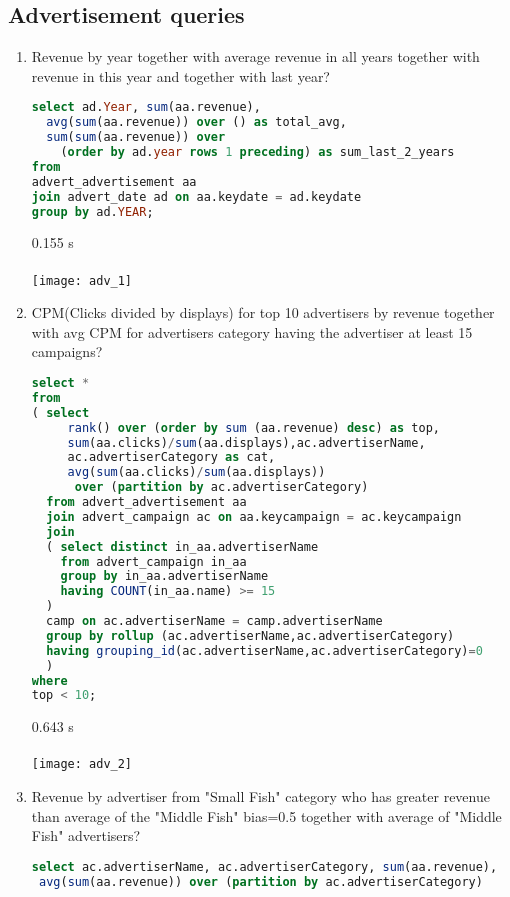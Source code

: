 \subsection*{Advertisement  queries} %
\label{sub:Advertisement queries}

\begin{enumerate}
\item Revenue by year together with average revenue in all years together with revenue in this year and together with last year?
\begin{lstlisting}[language=sql] 
select ad.Year, sum(aa.revenue), 
  avg(sum(aa.revenue)) over () as total_avg,
  sum(sum(aa.revenue)) over 
    (order by ad.year rows 1 preceding) as sum_last_2_years
from   
advert_advertisement aa
join advert_date ad on aa.keydate = ad.keydate
group by ad.YEAR;
\end{lstlisting}
     0.155 s\\ \\
      \texttt{[image: adv\_1]}
\item    CPM(Clicks divided by displays) for top 10 advertisers by revenue together with avg CPM for advertisers category having the advertiser at least 15 campaigns?
\begin{lstlisting}[language=sql] 
select *
from 
( select
     rank() over (order by sum (aa.revenue) desc) as top,
     sum(aa.clicks)/sum(aa.displays),ac.advertiserName,
     ac.advertiserCategory as cat, 
     avg(sum(aa.clicks)/sum(aa.displays)) 
      over (partition by ac.advertiserCategory)
  from advert_advertisement aa
  join advert_campaign ac on aa.keycampaign = ac.keycampaign
  join
  ( select distinct in_aa.advertiserName 
    from advert_campaign in_aa
    group by in_aa.advertiserName
    having COUNT(in_aa.name) >= 15
  )
  camp on ac.advertiserName = camp.advertiserName
  group by rollup (ac.advertiserName,ac.advertiserCategory) 
  having grouping_id(ac.advertiserName,ac.advertiserCategory)=0
  )
where 
top < 10;
\end{lstlisting}
     0.643 s\\ \\
      \texttt{[image: adv\_2]}
\item Revenue by advertiser from "Small Fish" category who has greater revenue than average of the "Middle Fish" bias=0.5 together with average of "Middle Fish" advertisers? 
  \begin{lstlisting}[language=sql] 
select ac.advertiserName, ac.advertiserCategory, sum(aa.revenue), 
 avg(sum(aa.revenue)) over (partition by ac.advertiserCategory) 

\end{lstlisting}
\end{enumerate}

